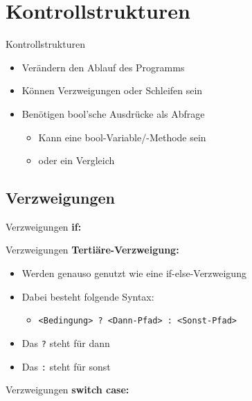 \section{Kontrollstrukturen}
\begin{frame}{Kontrollstrukturen}
	\begin{itemize}
		\item Verändern den Ablauf des Programms
		\item Können Verzweigungen oder Schleifen sein
		\item Benötigen bool'sche Ausdrücke als Abfrage
		\begin{itemize}
			\item Kann eine bool-Variable/-Methode sein
			\item oder ein Vergleich
		\end{itemize}
	\end{itemize}
\end{frame}

\subsection{Verzweigungen}
\begin{frame}{Verzweigungen}
	\textbf{if:}\\
	
\end{frame}

\begin{frame}{Verzweigungen}
	\textbf{Tertiäre-Verzweigung:}\\
	\begin{itemize}
		\item Werden genauso genutzt wie eine if-else-Verzweigung
		\item Dabei besteht folgende Syntax:
		\begin{itemize}
			\item \alert{\texttt{<Bedingung> ? <Dann-Pfad> : <Sonst-Pfad>}}
		\end{itemize}
		\item Das \alert{\texttt{?}} steht für \alert{dann}
		\item Das \alert{\texttt{:}} steht für \alert{sonst}
	\end{itemize}		
	
\end{frame}

\begin{frame}{Verzweigungen}
	\textbf{switch case:}\\
	
\end{frame}

